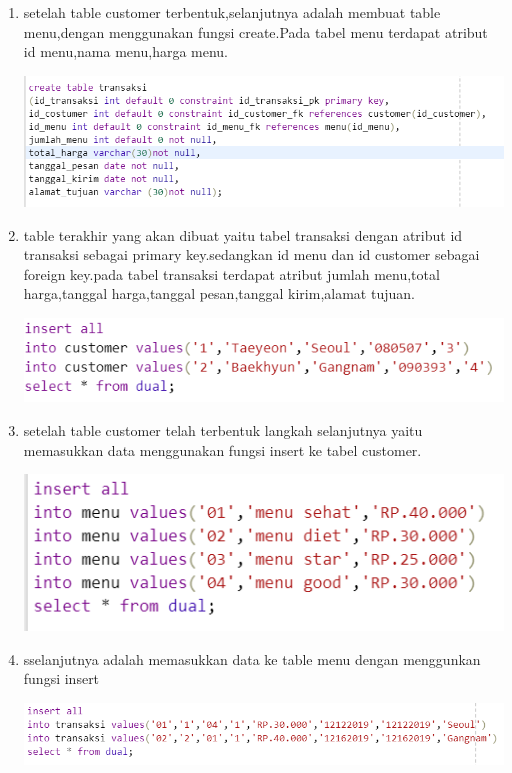 \documentclass[a4paper, 12pt]{article}
\begin{document}
\begin{enumerate}
\begin{center}
\end{center}
\item setelah table customer terbentuk,selanjutnya adalah membuat table menu,dengan menggunakan fungsi create.Pada tabel menu terdapat atribut id menu,nama menu,harga menu.
\begin{center}
    \includegraphics[width=.8\textwidth]{figure/23.PNG}
\end{center}
\item table terakhir yang akan dibuat yaitu tabel transaksi dengan atribut id transaksi sebagai primary key.sedangkan id menu dan id customer sebagai foreign key.pada tabel transaksi terdapat atribut jumlah menu,total harga,tanggal harga,tanggal pesan,tanggal kirim,alamat tujuan.
\begin{center}
    \includegraphics[width=.8\textwidth]{figure/24.PNG}
\end{center}
\item setelah table customer telah terbentuk langkah selanjutnya yaitu memasukkan data menggunakan fungsi insert ke tabel customer.
\begin{center}
    \includegraphics[width=.8\textwidth]{figure/25.PNG}
\end{center}
\item sselanjutnya adalah memasukkan data ke table menu dengan menggunkan fungsi insert
\begin{center}
    \includegraphics[width=.8\textwidth]{figure/26.PNG}

\end{center}
\end{enumerate}
\end{document}
